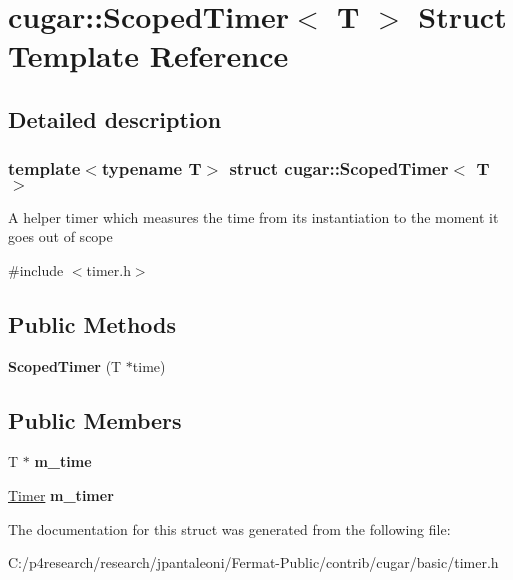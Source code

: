 \hypertarget{structcugar_1_1_scoped_timer}{}\section{cugar\+:\+:Scoped\+Timer$<$ T $>$ Struct Template Reference}
\label{structcugar_1_1_scoped_timer}


\subsection{Detailed description}
\subsubsection*{template$<$typename T$>$\newline
struct cugar\+::\+Scoped\+Timer$<$ T $>$}

A helper timer which measures the time from its instantiation to the moment it goes out of scope 

{\ttfamily \#include $<$timer.\+h$>$}

\subsection*{Public Methods}
\begin{DoxyCompactItemize}
\item 
\mbox{\label{structcugar_1_1_scoped_timer_a439da8b4598b31a335d232aa769fc078}} 
{\bfseries Scoped\+Timer} (T $\ast$time)
\end{DoxyCompactItemize}
\subsection*{Public Members}
\begin{DoxyCompactItemize}
\item 
\mbox{\label{structcugar_1_1_scoped_timer_ac52d49fa1a7e9802ba4855726f29ae3d}} 
T $\ast$ {\bfseries m\+\_\+time}
\item 
\mbox{\label{structcugar_1_1_scoped_timer_af920eafe8c776fa86fbfa791bf36dd05}} 
\hyperlink{structcugar_1_1_timer}{Timer} {\bfseries m\+\_\+timer}
\end{DoxyCompactItemize}


The documentation for this struct was generated from the following file\+:\begin{DoxyCompactItemize}
\item 
C\+:/p4research/research/jpantaleoni/\+Fermat-\/\+Public/contrib/cugar/basic/timer.\+h\end{DoxyCompactItemize}
